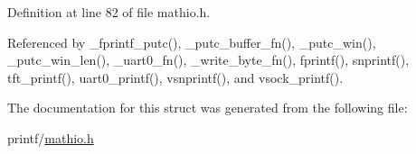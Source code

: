 Definition at line 82 of file mathio.\+h.



Referenced by \+\_\+fprintf\+\_\+putc(), \+\_\+putc\+\_\+buffer\+\_\+fn(), \+\_\+putc\+\_\+win(), \+\_\+putc\+\_\+win\+\_\+len(), \+\_\+uart0\+\_\+fn(), \+\_\+write\+\_\+byte\+\_\+fn(), fprintf(), snprintf(), tft\+\_\+printf(), uart0\+\_\+printf(), vsnprintf(), and vsock\+\_\+printf().



The documentation for this struct was generated from the following file\+:\begin{DoxyCompactItemize}
\item 
printf/\hyperlink{mathio_8h}{mathio.\+h}\end{DoxyCompactItemize}
